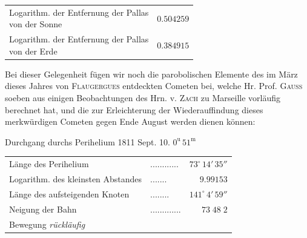 \begin{center}\fontsize{10}{12}\selectfont\setlength{\tabcolsep}{4pt}\renewcommand{\arraystretch}{1.15}\begin{tabular}{lr}
\shortstack[l]{Logarithm. der Entfernung der Pallas\\von der Sonne} & $0.504259$\\
\shortstack[l]{Logarithm. der Entfernung der Pallas\\von der Erde} & $0.384915$\\
\end{tabular}\end{center}

\par\indent Bei dieser Gelegenheit fügen wir noch die parobolischen  Elemente des im März dieses Jahres von \textsc{Flaugergues} entdeckten Cometen bei, welche Hr. Prof. \textsc{Gauss} soeben aus einigen Beobachtungen des Hrn. v. \textsc{Zach} zu Marseille vorläufig berechnet hat, und die zur Erleichterung der Wiederauffindung dieses merkwürdigen Cometen gegen Ende August werden dienen können:
\begin{center}Durchgang durchs Perihelium 1811 Sept. 10. $0^{\mathrm u}\,51^{\mathrm m}$\end{center}

\begin{center}\fontsize{10}{12}\selectfont\setlength{\tabcolsep}{4pt}\renewcommand{\arraystretch}{1.15}\begin{tabular}{llr}
Länge des Perihelium & .\;.\;.\;.\;.\;.\;.\;.\;.\;.\;.\;. & $73^\circ\,14'\,35''$\\
Logarithm. des kleinsten Abstandes & .\;.\;.\;.\;.\;.\;. & $9.99153$\\
Länge des aufsteigenden Knoten & .\;.\;.\;.\;.\;.\;.\;. & $141^\circ\,4'\,59''$\\
Neigung der Bahn & .\;.\;.\;.\;.\;.\;.\;.\;.\;.\;.\;.\;. & $73\;48\;2$\\
Bewegung \emph{rückläufig} &  & \\
\end{tabular}\end{center}

